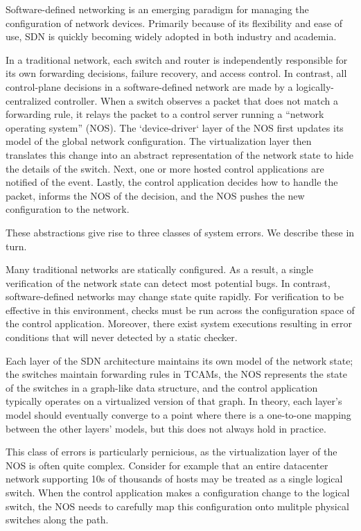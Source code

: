 Software-defined networking is an emerging paradigm for managing the
configuration of network devices. Primarily because of its flexibility and ease of use, SDN is
quickly becoming widely adopted in both industry and academia. 

In a traditional network, each switch and router is independently responsible for
its own forwarding decisions, failure recovery, and access control. In
contrast, all control-plane decisions in a software-defined network are made by
a logically-centralized controller. When a
switch observes a packet that does not match a forwarding rule, 
it relays the packet to a control server running a ``network operating system''
(NOS). The `device-driver` layer of the NOS first updates its model of the global network configuration.
The virtualization layer then translates this change into an abstract 
representation of the network state to hide the details of the switch. Next, one or more hosted control
applications are notified of the event. Lastly, the
control application decides how to handle the packet, informs the NOS of the decision,
and the NOS pushes the new configuration to the network.

These abstractions give rise to three classes of system errors. We describe these in turn.

 Many traditional networks are statically configured.
As a result, a single verification of the network state can detect most potential bugs. 
In contrast, software-defined networks may change state quite rapidly. For verification to be
effective in this environment, checks must be run across the configuration space of the control
 application. Moreover, there exist system executions resulting in error conditions that will never 
detected by a static checker. 

  Each layer of the SDN architecture
maintains its own model of the network state; the switches maintain forwarding
rules in TCAMs, the NOS represents the state of the switches in a graph-like data
structure, and the control application typically operates on 
a virtualized version of that graph. In theory, each layer's model should eventually
converge to a point where there is a one-to-one mapping 
between the other layers' models, but this does not always hold in practice.

This class of errors is particularly pernicious, as the 
virtualization layer of the NOS is often quite complex. Consider for example
that an entire datacenter network supporting 10s of thousands of hosts may be
treated as a single logical switch. When the control application makes a
configuration change to the logical switch, the NOS needs to carefully map this
configuration onto mulitple physical switches along the path.

